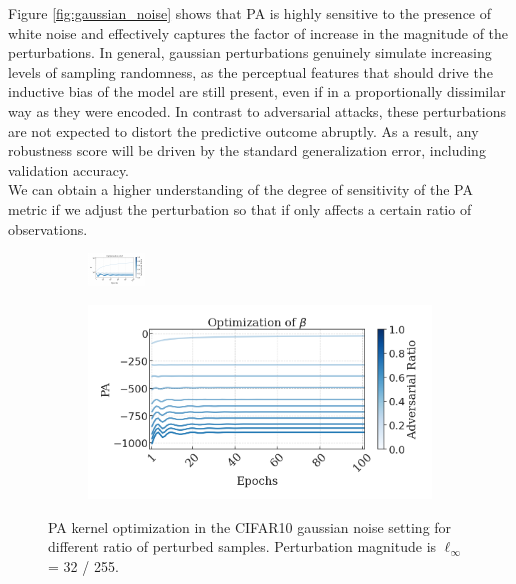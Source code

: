 Figure \ref{fig:gaussian_noise} shows that 
PA is highly sensitive to the presence of white noise and effectively captures the factor 
of increase in the magnitude of the perturbations. In general, gaussian perturbations genuinely simulate increasing levels of sampling randomness, as the 
perceptual features that should drive the inductive bias of the model are still present, even 
if in a proportionally dissimilar way as they were encoded. In contrast to adversarial attacks, 
these perturbations are not expected to distort the predictive outcome 
abruptly. As a result, any robustness score will be driven by the standard generalization error, including validation 
accuracy. \\

We can obtain a higher understanding of the degree of
sensitivity of the PA metric if we adjust the perturbation so that if only affects
a certain ratio of observations. \\

\begin{figure}[H]
    \centering
    \begin{subfigure}[b]{0.49\textwidth}
        \centering
        \includegraphics[width=\textwidth]{img/results_discussion/empirical/beta_100.pdf}
    \end{subfigure}
    \hfill
    \begin{subfigure}[b]{0.49\textwidth}
        \centering
        \includegraphics[width=\textwidth]{img/results_discussion/empirical/logPA_100.png}
    \end{subfigure}
    \caption{PA kernel optimization in the CIFAR10 gaussian noise setting for different ratio
    of perturbed samples. Perturbation magnitude is $\ell_\infty$ = 32 / 255.}
    \label{fig:gaussian_optimization}
\end{figure}

